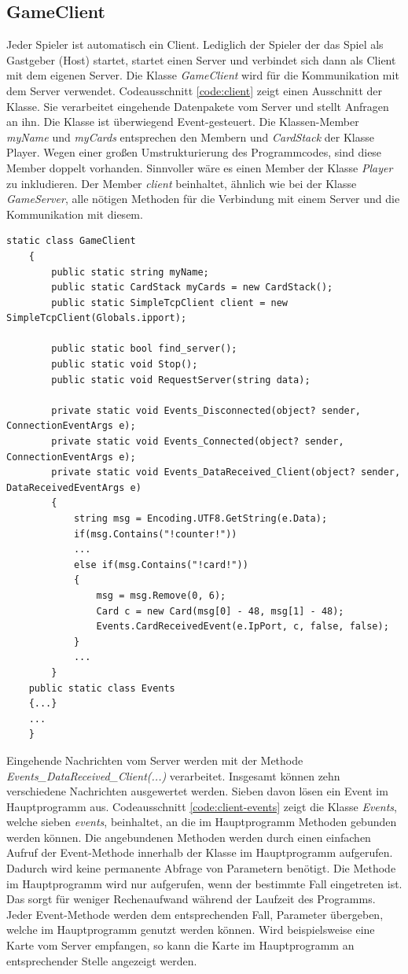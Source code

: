 \subsection{GameClient}
Jeder Spieler ist automatisch ein Client. Lediglich der Spieler der das Spiel als Gastgeber (Host) startet, startet einen Server und verbindet sich dann als Client mit dem eigenen Server. Die Klasse \textit{GameClient} wird für die Kommunikation mit dem Server verwendet. Codeausschnitt \ref{code:client} zeigt einen Ausschnitt der Klasse. Sie verarbeitet eingehende Datenpakete vom Server und stellt Anfragen an ihn. Die Klasse ist überwiegend Event-gesteuert. Die Klassen-Member \textit{myName} und \textit{myCards} entsprechen den Membern  und \textit{CardStack} der Klasse Player. Wegen einer großen Umstrukturierung des Programmcodes, sind diese Member doppelt vorhanden. Sinnvoller wäre es einen Member der Klasse \textit{Player} zu inkludieren. Der Member \textit{client} beinhaltet, ähnlich wie bei der Klasse \textit{GameServer}, alle nötigen Methoden für die Verbindung mit einem Server und die Kommunikation mit diesem.
\begin{lstlisting}[label=code:client, caption={Klasse GameClient}]
 	static class GameClient
	{
		public static string myName;
		public static CardStack myCards = new CardStack();
		public static SimpleTcpClient client = new SimpleTcpClient(Globals.ipport);
		
		public static bool find_server();
		public static void Stop();
		public static void RequestServer(string data);
		
		private static void Events_Disconnected(object? sender, ConnectionEventArgs e);
		private static void Events_Connected(object? sender, ConnectionEventArgs e);
		private static void Events_DataReceived_Client(object? sender, DataReceivedEventArgs e)
		{
			string msg = Encoding.UTF8.GetString(e.Data);
			if(msg.Contains("!counter!"))
			...
			else if(msg.Contains("!card!"))
			{
				msg = msg.Remove(0, 6);
				Card c = new Card(msg[0] - 48, msg[1] - 48);
				Events.CardReceivedEvent(e.IpPort, c, false, false);
			}
			...
		}
	public static class Events
	{...}
	...
	}
\end{lstlisting}
Eingehende Nachrichten vom Server werden mit der Methode \textit{Events\_DataReceived\_Client(...)} verarbeitet. Insgesamt können zehn verschiedene Nachrichten ausgewertet werden. Sieben davon lösen ein Event im Hauptprogramm aus. Codeausschnitt \ref{code:client-events} zeigt die Klasse \textit{Events}, welche sieben \textit{events}, beinhaltet, an die im Hauptprogramm Methoden gebunden werden können. Die angebundenen Methoden werden durch einen einfachen Aufruf der Event-Methode innerhalb der Klasse im Hauptprogramm aufgerufen. Dadurch wird keine permanente Abfrage von Parametern benötigt. Die Methode im Hauptprogramm wird nur aufgerufen, wenn der bestimmte Fall eingetreten ist. Das sorgt für weniger Rechenaufwand während der Laufzeit des Programms. Jeder Event-Methode werden dem entsprechenden Fall, Parameter übergeben, welche im Hauptprogramm genutzt werden können. Wird beispielsweise eine Karte vom Server empfangen, so kann die Karte im Hauptprogramm an entsprechender Stelle angezeigt werden. 
